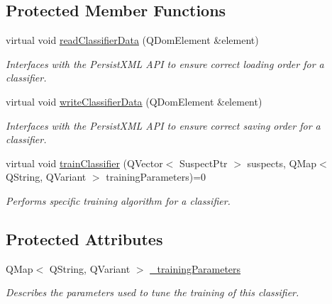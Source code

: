 \subsection*{\-Protected \-Member \-Functions}
\begin{DoxyCompactItemize}
\item 
virtual void \hyperlink{classhsom_1_1_classifier_a7005afab0da6cfd49119ba21e31f0d35}{read\-Classifier\-Data} (\-Q\-Dom\-Element \&element)
\begin{DoxyCompactList}\small\item\em \-Interfaces with the \-Persist\-X\-M\-L \-A\-P\-I to ensure correct loading order for a classifier. \end{DoxyCompactList}\item 
virtual void \hyperlink{classhsom_1_1_classifier_a44fd60ca14d06f5f3889e3d49573cd75}{write\-Classifier\-Data} (\-Q\-Dom\-Element \&element)
\begin{DoxyCompactList}\small\item\em \-Interfaces with the \-Persist\-X\-M\-L \-A\-P\-I to ensure correct saving order for a classifier. \end{DoxyCompactList}\item 
virtual void \hyperlink{classhsom_1_1_classifier_a1f622d490d89f851c8641b0401648acb}{train\-Classifier} (\-Q\-Vector$<$ \-Suspect\-Ptr $>$ suspects, \-Q\-Map$<$ \-Q\-String, \-Q\-Variant $>$ training\-Parameters)=0
\begin{DoxyCompactList}\small\item\em \-Performs specific training algorithm for a classifier. \end{DoxyCompactList}\end{DoxyCompactItemize}
\subsection*{\-Protected \-Attributes}
\begin{DoxyCompactItemize}
\item 
\hypertarget{classhsom_1_1_classifier_a57f42894e3369a20b4fd0f3dd8f3d8a5}{\-Q\-Map$<$ \-Q\-String, \-Q\-Variant $>$ \hyperlink{classhsom_1_1_classifier_a57f42894e3369a20b4fd0f3dd8f3d8a5}{\-\_\-training\-Parameters}}\label{classhsom_1_1_classifier_a57f42894e3369a20b4fd0f3dd8f3d8a5}

\begin{DoxyCompactList}\small\item\em \-Describes the parameters used to tune the training of this classifier. \end{DoxyCompactList}\end{DoxyCompactItemize}


